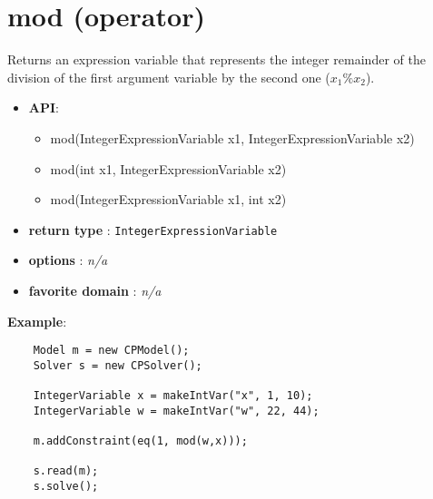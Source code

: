 
\section{mod (operator)}\label{mod:modoperator}\hypertarget{mod:modoperator}{}
Returns an expression variable that represents the integer remainder of the division of the first argument variable by the second one (\(x_1\%x_2\)).

\begin{itemize}
	\item \textbf{API}:
	\begin{itemize}
		\item mod(IntegerExpressionVariable x1, IntegerExpressionVariable x2)
		\item mod(int x1, IntegerExpressionVariable x2)
		\item mod(IntegerExpressionVariable x1, int x2)
	\end{itemize}
	\item \textbf{return type} : \texttt{IntegerExpressionVariable}
	\item \textbf{options} : \emph{n/a}
	\item \textbf{favorite domain} : \emph{n/a}
\end{itemize}

\textbf{Example}:
\begin{lstlisting}
	Model m = new CPModel();
	Solver s = new CPSolver();
	
	IntegerVariable x = makeIntVar("x", 1, 10);
	IntegerVariable w = makeIntVar("w", 22, 44);
	
	m.addConstraint(eq(1, mod(w,x)));
	
	s.read(m);
	s.solve();
\end{lstlisting}

